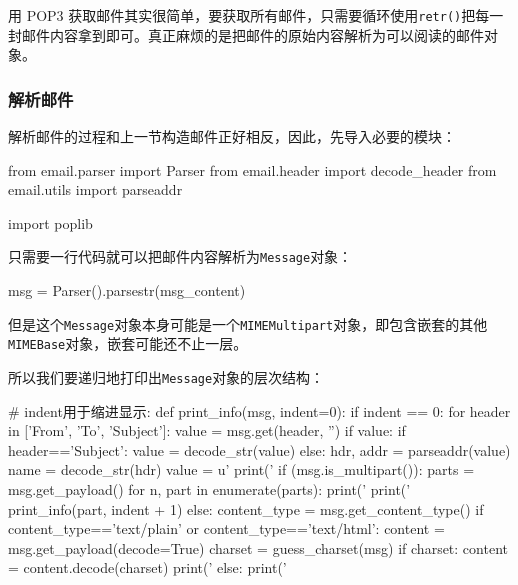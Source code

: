 用 POP3
获取邮件其实很简单，要获取所有邮件，只需要循环使用\texttt{retr()}把每一封邮件内容拿到即可。真正麻烦的是把邮件的原始内容解析为可以阅读的邮件对象。

\hypertarget{ux89e3ux6790ux90aeux4ef6}{%
\subsubsection{解析邮件}\label{ux89e3ux6790ux90aeux4ef6}}

解析邮件的过程和上一节构造邮件正好相反，因此，先导入必要的模块：

\begin{pythoncode}
from email.parser import Parser
from email.header import decode_header
from email.utils import parseaddr

import poplib
\end{pythoncode}

只需要一行代码就可以把邮件内容解析为\texttt{Message}对象：

\begin{pythoncode}
msg = Parser().parsestr(msg_content)
\end{pythoncode}

但是这个\texttt{Message}对象本身可能是一个\texttt{MIMEMultipart}对象，即包含嵌套的其他\texttt{MIMEBase}对象，嵌套可能还不止一层。

所以我们要递归地打印出\texttt{Message}对象的层次结构：

\begin{pythoncode}
# indent用于缩进显示:
def print_info(msg, indent=0):
    if indent == 0:
        for header in ['From', 'To', 'Subject']:
            value = msg.get(header, '')
            if value:
                if header=='Subject':
                    value = decode_str(value)
                else:
                    hdr, addr = parseaddr(value)
                    name = decode_str(hdr)
                    value = u'%
            print('%
    if (msg.is_multipart()):
        parts = msg.get_payload()
        for n, part in enumerate(parts):
            print('%
            print('%
            print_info(part, indent + 1)
    else:
        content_type = msg.get_content_type()
        if content_type=='text/plain' or content_type=='text/html':
            content = msg.get_payload(decode=True)
            charset = guess_charset(msg)
            if charset:
                content = content.decode(charset)
            print('%
        else:
            print('%
\end{pythoncode}

